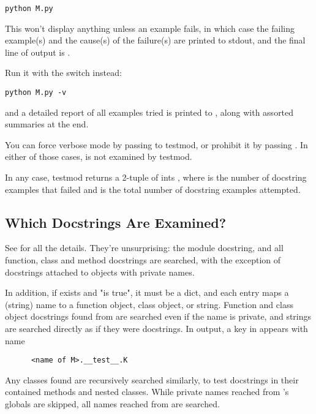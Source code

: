\begin{verbatim}
python M.py
\end{verbatim}

This won't display anything unless an example fails, in which case the
failing example(s) and the cause(s) of the failure(s) are printed to stdout,
and the final line of output is .

Run it with the  switch instead:

\begin{verbatim}
python M.py -v
\end{verbatim}

and a detailed report of all examples tried is printed to ,
along with assorted summaries at the end.

You can force verbose mode by passing  to testmod, or
prohibit it by passing .  In either of those cases,
 is not examined by testmod.

In any case, testmod returns a 2-tuple of ints , where  is the number of docstring examples that
failed and  is the total number of docstring examples
attempted.

\subsection{Which Docstrings Are Examined?}

See  for all the details.  They're unsurprising:  the
module docstring, and all function, class and method docstrings are
searched, with the exception of docstrings attached to objects with private
names.

In addition, if  exists and "is true", it must be a
dict, and each entry maps a (string) name to a function object, class
object, or string.  Function and class object docstrings found from
 are searched even if the name is private, and
strings are searched directly as if they were docstrings.  In output,
a key  in  appears with name

\begin{verbatim}
      <name of M>.__test__.K
\end{verbatim}

Any classes found are recursively searched similarly, to test docstrings in
their contained methods and nested classes.  While private names reached
from 's globals are skipped, all names reached from
 are searched.

